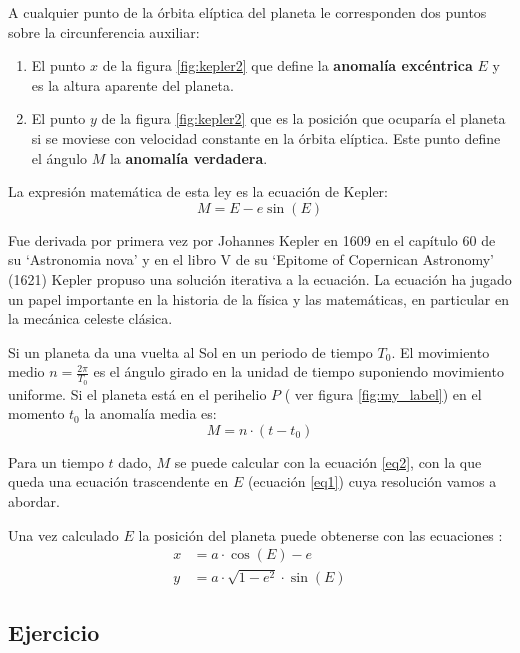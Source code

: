 A cualquier punto de la órbita elíptica del planeta le corresponden dos puntos sobre la circunferencia auxiliar:
\begin{enumerate}
    \item El punto $x$ de la figura \ref{fig:kepler2} que define la \textbf{anomalía excéntrica} $E$ y es la altura aparente del planeta.
    \item El punto $y$ de la figura \ref{fig:kepler2}  que es la posición que ocuparía el planeta si se moviese con velocidad constante en la órbita elíptica. Este punto define el ángulo $M$ la \textbf{anomalía verdadera}.
\end{enumerate}

La expresión matemática de esta ley es la ecuación de Kepler:
\begin{equation} \label{eq1}
    M=E-e\sin(E)
\end{equation}

Fue derivada por primera vez por Johannes Kepler en 1609 en el capítulo 60 de su ‘Astronomia nova’ y en el libro V de su ‘Epitome of Copernican Astronomy’ (1621) Kepler propuso una solución iterativa a la ecuación. La ecuación ha jugado un papel importante en la historia de la física y las matemáticas, en particular en la mecánica celeste clásica.

Si un planeta da una vuelta al Sol en un periodo de tiempo $T_0$. El movimiento medio $n=\frac{2\pi}{T_0}$ es el ángulo girado en la unidad de tiempo suponiendo movimiento uniforme. Si el planeta está en el perihelio  $P$ ( ver figura \ref{fig:my_label}) en  el momento $t_0$ la anomalía media es:
\begin{equation} \label{eq2}
     M = n \cdot (t -  t_0)
\end{equation}

Para un tiempo $t$ dado, $M$ se puede calcular con la ecuación \ref{eq2}, con la que queda una ecuación trascendente en $E$ (ecuación \ref{eq1}) cuya resolución vamos a abordar. 

Una vez calculado $E$ la posición del planeta puede obtenerse con las ecuaciones :
\begin{align}
    x &= a \cdot  \cos(E)-e \\
    y &= a \cdot \sqrt{1-e^2} \cdot \sin(E)
\end{align}

\subsection*{Ejercicio}

